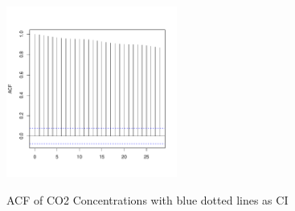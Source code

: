 \documentclass[11pt, a4paper]{article} %
\begin{document}
\begin{figure}[t]
 \caption{ACF of CO2 Concentrations with blue dotted lines as CI}
 \begin{center}
\includegraphics[width=0.5\textwidth]{alleselena-ACF_co2.pdf}
\label{correlogramlm}
\end{center}
\end{figure}
\end{document}
